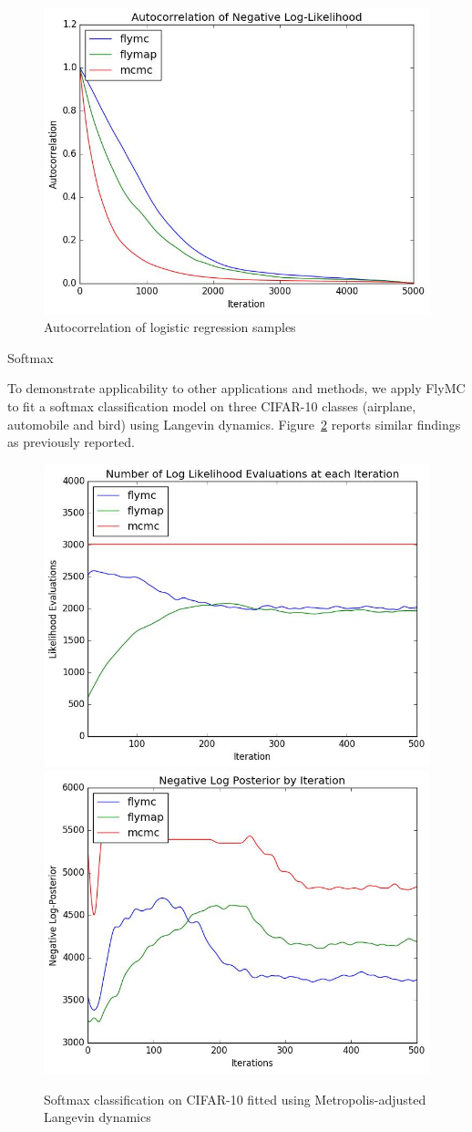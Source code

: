 \documentclass[final]{beamer}
\newlength{\onecolwid}
\begin{document}
\begin{frame}[t]
\begin{columns}[t]
\begin{column}{\onecolwid}
\begin{figure}
  \includegraphics[width=0.8\linewidth]{Figures/acf_logistic.png}
  \caption{Autocorrelation of logistic regression samples}
  \label{fig:acf}
\end{figure}

\begin{block}{Softmax}

To demonstrate applicability to other applications and methods, we
apply FlyMC to fit a softmax classification model on three CIFAR-10
classes (airplane, automobile and bird) using Langevin
dynamics. Figure~\ref{fig:softmax} reports similar findings as
previously reported.

\begin{figure}
  \includegraphics[width=0.5\linewidth]{Figures/log_lik_softmax.png}
  \includegraphics[width=0.5\linewidth]{Figures/nlp_softmax.png}
  \caption{Softmax classification on CIFAR-10 fitted using Metropolis-adjusted Langevin dynamics}
  \label{fig:softmax}
\end{figure}


\end{block}
\end{column}
\end{columns}
\end{frame}
\end{document}
